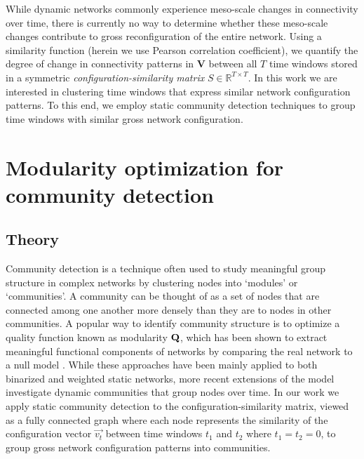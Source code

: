 While dynamic networks commonly experience meso-scale changes in connectivity over time, there is currently no way to determine whether these meso-scale changes contribute to gross reconfiguration of the entire network. Using a similarity function (herein we use Pearson correlation coefficient), we quantify the degree of change in connectivity patterns in $\textbf{V}$ between all $T$ time windows stored in a symmetric \textit{configuration-similarity matrix} $S \in \mathbb{R}^{T\times T}$. In this work we are interested in clustering time windows that express similar network configuration patterns. To this end, we employ static community detection techniques to group time windows with similar gross network configuration.


\section{Modularity optimization for community detection}
\subsection{Theory}
Community detection is a technique often used to study meaningful group structure in complex networks by clustering nodes into `modules' or `communities'. A community can be thought of as a set of nodes that are connected among one another more densely than they are to nodes in other communities. A popular way to identify community structure is to optimize a quality function known as modularity $\mathbf{\displaystyle Q}$, which has been shown to extract meaningful functional components of networks by comparing the real network to a null model \cite{newman2004finding, newman2006modularity, porter2009communities, fortunato2010community}. While these approaches have been mainly applied to both binarized and weighted static networks, more recent extensions of the model investigate dynamic communities that group nodes over time. In our work we apply static community detection to the configuration-similarity matrix, viewed as a fully connected graph where each node represents the similarity of the configuration vector $\vec{v_{t}}$ between time windows $t_1$ and $t_2$ where $t_1=t_2=0$, to group gross network configuration patterns into communities.  

